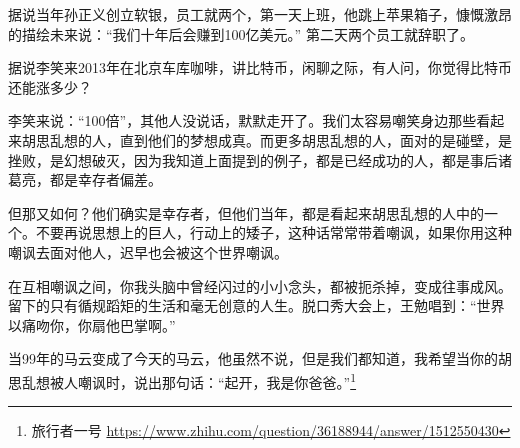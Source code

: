 据说当年孙正义创立软银，员工就两个，第一天上班，他跳上苹果箱子，慷慨激昂的描绘未来说：“我们十年后会赚到100亿美元。” 第二天两个员工就辞职了。

据说李笑来2013年在北京车库咖啡，讲比特币，闲聊之际，有人问，你觉得比特币还能涨多少？

李笑来说：“100倍”，其他人没说话，默默走开了。我们太容易嘲笑身边那些看起来胡思乱想的人，直到他们的梦想成真。而更多胡思乱想的人，面对的是碰壁，是挫败，是幻想破灭，因为我知道上面提到的例子，都是已经成功的人，都是事后诸葛亮，都是幸存者偏差。

但那又如何？他们确实是幸存者，但他们当年，都是看起来胡思乱想的人中的一个。不要再说思想上的巨人，行动上的矮子，这种话常常带着嘲讽，如果你用这种嘲讽去面对他人，迟早也会被这个世界嘲讽。

在互相嘲讽之间，你我头脑中曾经闪过的小小念头，都被扼杀掉，变成往事成风。留下的只有循规蹈矩的生活和毫无创意的人生。脱口秀大会上，王勉唱到：“世界以痛吻你，你扇他巴掌啊。”

当99年的马云变成了今天的马云，他虽然不说，但是我们都知道，我希望当你的胡思乱想被人嘲讽时，说出那句话：“起开，我是你爸爸。”\footnote{旅行者一号 \quad \url{https://www.zhihu.com/question/36188944/answer/1512550430}}

